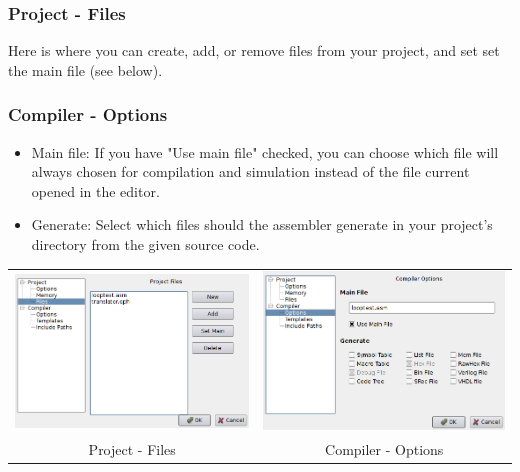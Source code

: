         \subsubsection{Project - Files}
            Here is where you can create, add, or remove files from your project, and set set the main file (see below).

        \subsubsection{Compiler - Options}
            \begin{itemize}
                \item Main file: If you have "Use main file" checked, you can choose which file will always chosen for
                        compilation and simulation instead of the file current opened in the editor.
                \item Generate: Select which files should the assembler generate in your project's directory from the
                        given source code.
            \end{itemize}

            \begin{table}[h!]
                \begin{tabular}{cc}
                    \includegraphics[width=.5\textwidth]{img/config3.png}
                        &
                    \includegraphics[width=.5\textwidth]{img/config4.png}
                        \\
                    Project - Files & Compiler - Options
                \end{tabular}
            \end{table}

